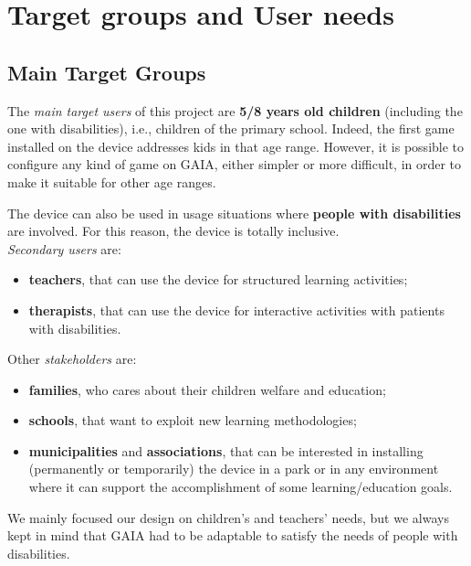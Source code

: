 \documentclass[a4paper,11pt]{report}
\begin{document}
\chapter{Target groups and User needs}
\section{Main Target Groups}
The \emph{main target users} of this project are \textbf{5/8 years old children} (including the one with disabilities), i.e., children of the primary school. Indeed, the first game installed on the device  addresses kids in that age range. However, it is possible to configure any kind of game on GAIA, either simpler or more difficult, in order to make it suitable for other age ranges.\par
The device can also be used in usage situations where \textbf{people with disabilities} are involved. For this reason, the device is totally inclusive.\\
\emph{Secondary users} are:
\begin{itemize}
	\item \textbf{teachers}, that can use the device for structured learning activities;
	\item \textbf{therapists}, that can use the device for interactive activities with patients with disabilities.
\end{itemize}	
Other \emph{stakeholders} are:
\begin{itemize}
	\item \textbf{families}, who cares about their children welfare and education;
	\item \textbf{schools}, that want to exploit new learning methodologies;
	\item \textbf{municipalities} and \textbf{associations}, that can be interested in installing (permanently or temporarily) the device in a park or in any environment where it can support the accomplishment of some learning/education goals.
\end{itemize}
We mainly focused our design on children's and teachers' needs, but we always kept in mind that GAIA had to be adaptable to satisfy the needs of people with disabilities.
\end{document}
